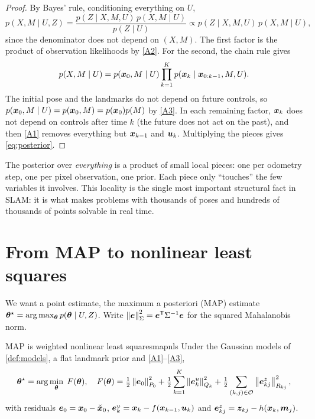 \begin{proof}
By Bayes' rule, conditioning everything on $U$,
\[
  p(X,M\mid U,Z)=\frac{p(Z\mid X,M,U)\,p(X,M\mid U)}{p(Z\mid U)}
  \propto p(Z\mid X,M,U)\,p(X,M\mid U),
\]
since the denominator does not depend on $(X,M)$. The first factor is the
product of observation likelihoods by \ref{A2}. For the second, the chain
rule gives
\[
  p(X,M\mid U)=p(\bm{x}_0,M\mid U)\prod_{k=1}^K
  p(\bm{x}_k\mid\bm{x}_{0:k-1},M,U).
\]
The initial pose and the landmarks do not depend on future controls, so
$p(\bm{x}_0,M\mid U)=p(\bm{x}_0,M)=p(\bm{x}_0)p(M)$ by \ref{A3}. In each remaining
factor, $\bm{x}_k$ does not depend on controls after time $k$ (the future does
not act on the past), and then \ref{A1} removes everything but
$\bm{x}_{k-1}$ and $\bm{u}_k$. Multiplying the pieces gives \eqref{eq:posterior}.
\end{proof}

\begin{inwords}
The posterior over \emph{everything} is a product of small local pieces:
one per odometry step, one per pixel observation, one prior. Each piece
only ``touches'' the few variables it involves. This locality is the single
most important structural fact in SLAM: it is what makes problems with
thousands of poses and hundreds of thousands of points solvable in real
time.
\end{inwords}

\section{From MAP to nonlinear least squares}

We want a point estimate, the maximum a posteriori (MAP) estimate
$\bm{\theta}^\star=\arg\max_{\bm{\theta}}p(\bm{\theta}\mid U,Z)$. Write
$\left\lVert \bm{e}\right\rVert_{\Sigma}^2=\bm{e}^{\mathsf{T}}\Sigma^{-1}\bm{e}$ for the squared
Mahalanobis norm.

\begin{proposition}{MAP is weighted nonlinear least squares}{mapnls}
Under the Gaussian models of \cref{def:models}, a flat landmark prior and
\ref{A1}--\ref{A3},
\begin{equation}\label{eq:nls}
\bm{\theta}^\star=\arg\min_{\bm{\theta}}\;F(\bm{\theta}),\quad
F(\bm{\theta})=\tfrac12\left\lVert \bm{e}_0\right\rVert_{P_0}^2
 +\tfrac12\sum_{k=1}^{K}\left\lVert \bm{e}^{u}_k\right\rVert_{Q_k}^2
 +\tfrac12\sum_{(k,j)\in\mathcal{O}}\left\lVert \bm{e}^{z}_{kj}\right\rVert_{R_{kj}}^2,
\end{equation}
with residuals $\bm{e}_0=\bm{x}_0-\check{\bm{x}}_0$,
$\bm{e}^u_k=\bm{x}_k-f(\bm{x}_{k-1},\bm{u}_k)$ and
$\bm{e}^z_{kj}=\bm{z}_{kj}-h(\bm{x}_k,\bm{m}_j)$.
\end{proposition}

